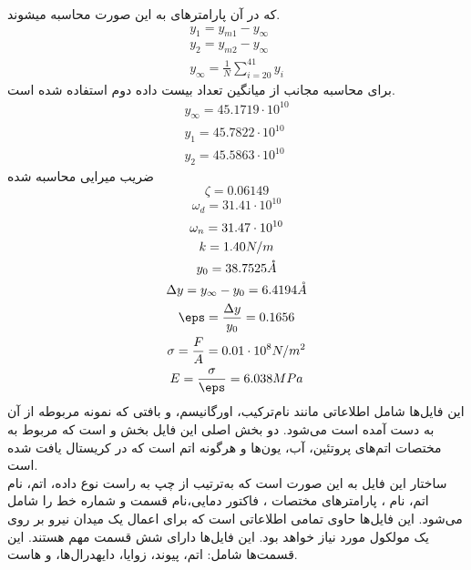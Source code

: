 که در آن پارامتر‌‌های به این صورت محاسبه میشوند.
\begin{equation}
	\begin{gathered}
		y_1 = y_{m1} - y_\infty \\
		y_2 = y_{m2} - y_\infty \\
		y_\infty = \frac{1}{N}\sum_{i = 20}^{41}y_i
	\end{gathered}
\end{equation}
برای محاسبه مجانب از میانگین تعداد بیست داده دوم استفاده شده است.
\begin{equation*}
	\begin{gathered}
		y_\infty = 45.1719\cdot10^{10}\\
		y_1 = 45.7822\cdot10^{10}\\
		y_2 = 45.5863\cdot10^{10}
	\end{gathered}
\end{equation*}
ضریب میرایی محاسبه شده 
\begin{equation*}
	\zeta = 0.06149
\end{equation*}
\begin{equation*}
	\omega_d = 31.41\cdot10^{10}
\end{equation*}
\begin{equation*}
	\begin{gathered}
		\omega_n = 31.47\cdot10^{10}\\
		k = 1.40 N/m\\
		y_0 = 38.7525 \mathring{A}\\
		\Delta y = y_\infty - y_0 = 6.4194 \mathring{A}\\
		\eps = \frac{\Delta y}{y_0} = 0.1656\\
		\sigma = \frac{F}{A} = 0.01\cdot10^8 N/m^2\\
		E  = \frac{\sigma}{\eps} = 6.038 MPa
	\end{gathered}
\end{equation*}
این فایل‌ها شامل اطلاعاتی مانند نام‌ترکیب، اورگانیسم، و بافتی که نمونه مربوطه از آن به دست آمده است می‌شود. دو بخش اصلی این فایل بخش  و  است که مربوط به مختصات اتم‌‌های پروتئین، آب، یون‌ها و هرگونه اتم  است که در کریستال یافت شده است.
\\
ساختار این فایل به این صورت است که به‌ترتیب از چپ به راست نوع داده،  اتم،‌ نام اتم،‌ نام  ،   پارامتر‌‌های مختصات ، فاکتور دمایی،‌نام قسمت و شماره خط را شامل می‌شود.
این فایل‌ها حاوی تمامی اطلاعاتی است که برای اعمال یک میدان نیرو بر روی یک مولکول مورد نیاز خواهد بود. این فایل‌ها دارای شش قسمت مهم هستند. این قسمت‌ها شامل: اتم،‌ پیوند، زوایا، دایهدرال‌ها،  و ‌هاست.



